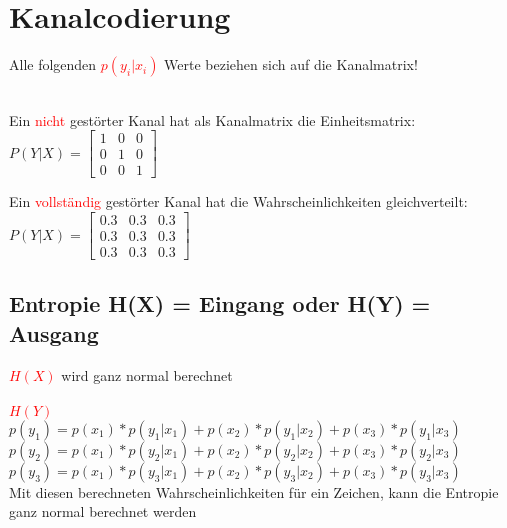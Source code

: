 
\section{Kanalcodierung}
Alle folgenden \textcolor{red}{$p(y_i|x_i)$} Werte beziehen sich auf die Kanalmatrix!\\\\
\begin{minipage}[t]{0.15\textwidth}
    Ein \textcolor{red}{nicht} gestörter Kanal hat als Kanalmatrix die Einheitsmatrix:\\
    $P(Y|X) = \begin{bmatrix}
                  1 & 0 & 0\\
                  0 & 1 & 0\\
                  0 & 0 & 1
    \end{bmatrix}$
\end{minipage}
\hfill
\begin{minipage}[t]{0.15\textwidth}
    Ein \textcolor{red}{vollständig} gestörter Kanal hat die Wahrscheinlichkeiten gleichverteilt:\\
    $P(Y|X) = \begin{bmatrix}
                  0.3 & 0.3 & 0.3\\
                  0.3 & 0.3 & 0.3\\
                  0.3 & 0.3 & 0.3
    \end{bmatrix}$
\end{minipage}


\subsection{Entropie H(X) = Eingang oder H(Y) = Ausgang}
\textcolor{red}{$H(X)$} wird ganz normal berechnet\\\\
\textcolor{red}{$H(Y)$} \\
\colorbox{lightlightgrey}{$p(y_1) = p(x_1)*p(y_1|x_1) + p(x_2)*p(y_1|x_2) + p(x_3)*p(y_1|x_3)$}\\
\colorbox{lightlightgrey}{$p(y_2) = p(x_1)*p(y_2|x_1) + p(x_2)*p(y_2|x_2) + p(x_3)*p(y_2|x_3)$}\\
\colorbox{lightlightgrey}{$p(y_3) = p(x_1)*p(y_3|x_1) + p(x_2)*p(y_3|x_2) + p(x_3)*p(y_3|x_3)$}\\
Mit diesen berechneten Wahrscheinlichkeiten für ein Zeichen, kann die Entropie ganz normal berechnet werden


